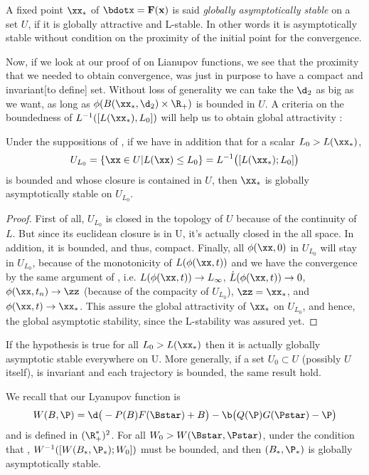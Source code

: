 \begin{definition}
    A fixed point $\xx_*$ of $\bdotx=\mathbf{F}(\mathbf{x})$ is said \emph{globally asymptotically stable} on a set $U$, if it is globally attractive and L-stable. In other words it is asymptotically stable without condition on the proximity of the initial point for the convergence.
\end{definition}
Now, if we look at our proof of  on Lianupov functions, we see that the proximity that we needed to obtain convergence, was just in purpose to have a compact and invariant[to define] set. Without loss of generality we can take the $\d_2$ as big as we want, as long as $\phi(B(\xx_*,\d_2)\times\R_+)$ is bounded in $U$. A criteria on the boundedness of $L^{-1}([L(\xx_*),L_0])$ will help us to obtain global attractivity :
\begin{theoreme}
Under the suppositions of , if we have in addition that for a scalar $L_0>L(\xx_*)$,
\[ U_{L_0} = \{ \xx\in U | L(\xx) \leq L_0\} = L^{-1}\big([L(\xx_*);L_0]\big) \]
is bounded and whose closure is contained in $U$, then $\xx_*$ is globally asymptotically stable on $U_{L_0}$.
\end{theoreme}
\begin{proof}
First of all, $U_{L_0}$ is closed in the topology of $U$ because of the continuity of $L$. But since its euclidean closure is in U, it's actually closed in the all space. In addition, it is bounded, and thus, compact. Finally, all $\phi(\xx,0)$ in $U_{L_0}$ will stay in $U_{L_0}$, because of the monotonicity of $L(\phi(\xx,t))$ and we have the convergence by the same argument of , i.e. $L(\phi(\xx,t))\to L_\infty$, $\dot{L}(\phi(\xx,t))\to 0$, $\phi(\xx,t_n)\to \zz$ (because of the compacity of $U_{L_0}$), $\zz=\xx_*$, and $\phi(\xx,t)\to \xx_*$. This assure the global attractivity of $\xx_*$ on $U_{L_0}$, and hence, the global asymptotic stability, since the L-stability was assured yet.
\end{proof}

\begin{remarque}
If the hypothesis is true for all $L_0>L(\xx_*)$ then it is actually globally asymptotic stable everywhere on U. More generally, if a set $U_0\subset U$ (possibly $U$ itself), is invariant and each trajectory is bounded, the same result hold.
\end{remarque}
We recall that our Lyanupov function is 
\[W(B,\P) = \d \big(-P(B)F(\Bstar) + B\big) 
-\b\big(Q(\P) G(\Pstar)-\P\big)\]
and is defined in $(\R^*_+)^2$. For all $W_0>W(\Bstar,\Pstar)$, under the condition that , $W^{-1}([W(B_*,\P_*);W_0])$ must be bounded, and then $(B_*,\P_*)$ is globally asymptotically stable.
